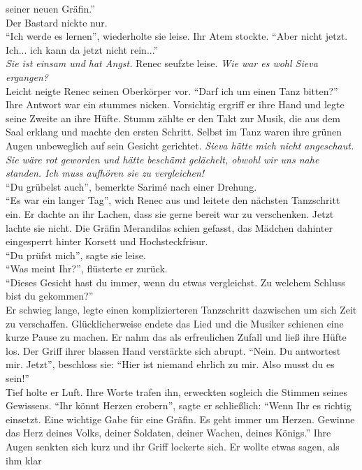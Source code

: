seiner neuen Gräfin.''\\
Der Bastard nickte nur.\\
``Ich werde es lernen'', wiederholte sie leise. Ihr Atem stockte. ``Aber nicht jetzt. Ich... ich 
kann da jetzt nicht rein...''\\
\textit{Sie ist einsam und hat Angst.} Renec seufzte leise. \textit{Wie war es wohl Sieva 
ergangen?}\\
Leicht neigte Renec seinen Oberkörper vor. ``Darf ich um einen Tanz bitten?''\\
Ihre Antwort war ein stummes nicken. Vorsichtig ergriff er ihre Hand und legte seine Zweite an ihre 
Hüfte. Stumm zählte er den Takt zur Musik, die aus dem Saal erklang und machte den ersten Schritt. 
Selbst im Tanz waren ihre grünen Augen unbeweglich auf sein Gesicht gerichtet. \textit{Sieva 
hätte mich nicht angeschaut. Sie wäre rot geworden und hätte beschämt gelächelt, obwohl wir uns 
nahe standen. Ich muss aufhören sie zu vergleichen!}\\
``Du grübelst auch'', bemerkte Sarimé nach einer Drehung.\\
``Es war ein langer Tag'', wich Renec aus und leitete den nächsten Tanzschritt ein. Er dachte an 
ihr Lachen, dass sie gerne bereit war zu verschenken. Jetzt lachte sie nicht. Die Gräfin Merandilas 
schien gefasst, das Mädchen dahinter eingesperrt hinter Korsett und Hochsteckfrisur. \\
``Du prüfst mich'', sagte sie leise.\\
``Was meint Ihr?'', flüsterte er zurück.\\
``Dieses Gesicht hast du immer, wenn du etwas vergleichst. Zu welchem Schluss bist du gekommen?''\\
Er schwieg lange, legte einen komplizierteren Tanzschritt dazwischen um sich Zeit zu verschaffen. 
Glücklicherweise endete das Lied und die Musiker schienen eine kurze Pause zu machen. Er nahm das 
als erfreulichen Zufall und ließ ihre Hüfte los. Der Griff ihrer blassen Hand verstärkte sich 
abrupt. ``Nein. Du antwortest mir. Jetzt'', beschloss sie: ``Hier ist niemand ehrlich zu mir. Also 
musst du es sein!''\\
Tief holte er Luft. Ihre Worte trafen ihn, erweckten sogleich die Stimmen seines Gewissens. ``Ihr 
könnt Herzen erobern'', sagte er schließlich: ``Wenn Ihr es richtig einsetzt. Eine wichtige Gabe für 
eine Gräfin. Es geht immer um Herzen. Gewinne das Herz deines Volks, deiner Soldaten, deiner 
Wachen, deines Königs.''
Ihre Augen senkten sich kurz und ihr Griff lockerte sich. Er wollte etwas sagen, als ihm klar 

